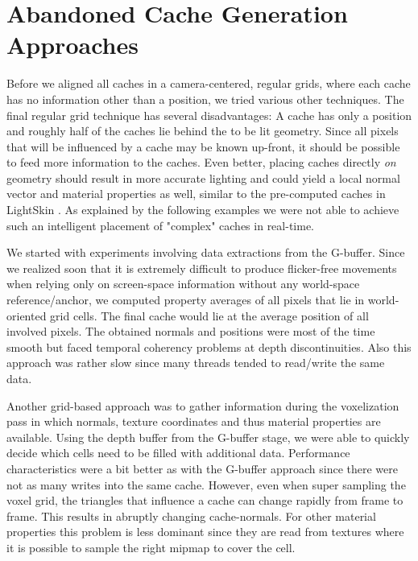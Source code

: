 \documentclass[thesis.tex]{subfiles}
\begin{document}
\section{Abandoned Cache Generation Approaches} \label{chap:abandoned}


Before we aligned all caches in a camera-centered, regular grids, where each cache has no information other than a position, we tried various other techniques. %
The final regular grid technique has several disadvantages:
A cache has only a position and roughly half of the caches lie behind the to be lit geometry.
Since all pixels that will be influenced by a cache may be known up-front, it should be possible to feed more information to the caches.
Even better, placing caches directly \emph{on} geometry should result in more accurate lighting and could yield a local normal vector and material properties as well, similar to the pre-computed caches in LightSkin \cite{bib:LightskinPaper}.
As explained by the following examples we were not able to achieve such an intelligent placement of "complex" caches in real-time.

We started with experiments involving data extractions from the G-buffer.
Since we realized soon that it is extremely difficult to produce flicker-free movements when relying only on screen-space information without any world-space reference/anchor, we computed property averages of all pixels that lie in world-oriented grid cells.
The final cache would lie at the average position of all involved pixels.
The obtained normals and positions were most of the time smooth but faced temporal coherency problems at depth discontinuities.
Also this approach was rather slow since many threads tended to read/write the same data.

Another grid-based approach was to gather information during the voxelization pass in which normals, texture coordinates and thus material properties are available.
Using the depth buffer from the G-buffer stage, we were able to quickly decide which cells need to be filled with additional data.
Performance characteristics were a bit better as with the G-buffer approach since there were not as many writes into the same cache.
However, even when super sampling the voxel grid, the triangles that influence a cache can change rapidly from frame to frame.
This results in abruptly changing cache-normals.
For other material properties this problem is less dominant since they are read from textures where it is possible to sample the right mipmap to cover the cell.
\end{document}
